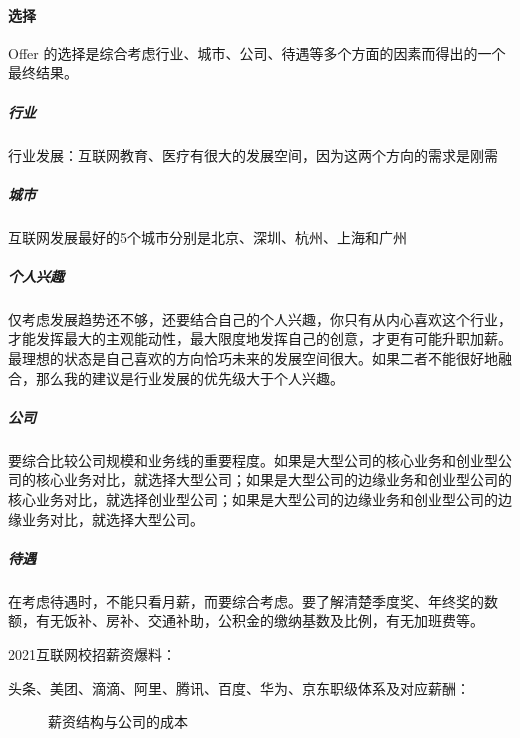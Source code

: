 \documentclass[letterpaper,11pt,english]{sphinxmanual}
\begin{document}
\paragraph{选择}
\label{\detokenize{chapter_interview/HR:id9}}
Offer
的选择是综合考虑行业、城市、公司、待遇等多个方面的因素而得出的一个最终结果。


\subparagraph{行业}
\label{\detokenize{chapter_interview/HR:id10}}
行业发展：互联网教育、医疗有很大的发展空间，因为这两个方向的需求是刚需


\subparagraph{城市}
\label{\detokenize{chapter_interview/HR:id11}}
互联网发展最好的5个城市分别是北京、深圳、杭州、上海和广州

%
\begin{footnote}[782]\sphinxAtStartFootnote
{}
%
\end{footnote}


\subparagraph{个人兴趣}
\label{\detokenize{chapter_interview/HR:id12}}
仅考虑发展趋势还不够，还要结合自己的个人兴趣，你只有从内心喜欢这个行业，才能发挥最大的主观能动性，最大限度地发挥自己的创意，才更有可能升职加薪。最理想的状态是自己喜欢的方向恰巧未来的发展空间很大。如果二者不能很好地融合，那么我的建议是行业发展的优先级大于个人兴趣。


\subparagraph{公司}
\label{\detokenize{chapter_interview/HR:id13}}
要综合比较公司规模和业务线的重要程度。如果是大型公司的核心业务和创业型公司的核心业务对比，就选择大型公司；如果是大型公司的边缘业务和创业型公司的核心业务对比，就选择创业型公司；如果是大型公司的边缘业务和创业型公司的边缘业务对比，就选择大型公司。


\subparagraph{待遇}
\label{\detokenize{chapter_interview/HR:id14}}
在考虑待遇时，不能只看月薪，而要综合考虑。要了解清楚季度奖、年终奖的数额，有无饭补、房补、交通补助，公积金的缴纳基数及比例，有无加班费等。

2021互联网校招薪资爆料：

头条、美团、滴滴、阿里、腾讯、百度、华为、京东职级体系及对应薪酬：

\begin{figure}[H]
\centering
\capstart

\noindent{}
\caption{薪资结构与公司的成本\sphinxfootnotemark[783]}\label{\detokenize{chapter_interview/HR:id16}}\end{figure}
%
\begin{footnotetext}[783]\sphinxAtStartFootnote
{}
%
\end{footnotetext}\ignorespaces 
\end{document}
